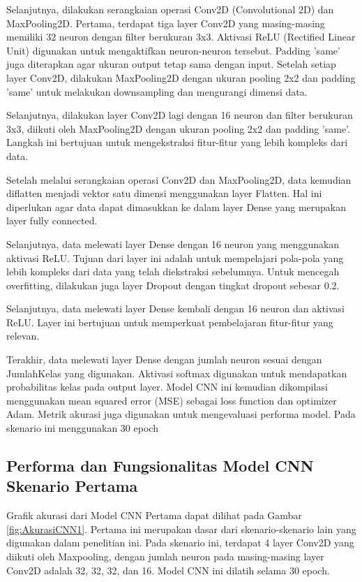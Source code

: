 Selanjutnya, dilakukan serangkaian operasi Conv2D (Convolutional 2D) dan MaxPooling2D. Pertama, terdapat tiga layer Conv2D yang masing-masing memiliki 32 neuron dengan filter berukuran 3x3. Aktivasi ReLU (Rectified Linear Unit) digunakan untuk mengaktifkan neuron-neuron tersebut. Padding 'same' juga diterapkan agar ukuran output tetap sama dengan input. Setelah setiap layer Conv2D, dilakukan MaxPooling2D dengan ukuran pooling 2x2 dan padding 'same' untuk melakukan downsampling dan mengurangi dimensi data.

Selanjutnya, dilakukan layer Conv2D lagi dengan 16 neuron dan filter berukuran 3x3, diikuti oleh MaxPooling2D dengan ukuran pooling 2x2 dan padding 'same'. Langkah ini bertujuan untuk mengekstraksi fitur-fitur yang lebih kompleks dari data.

Setelah melalui serangkaian operasi Conv2D dan MaxPooling2D, data kemudian diflatten menjadi vektor satu dimensi menggunakan layer Flatten. Hal ini diperlukan agar data dapat dimasukkan ke dalam layer Dense yang merupakan layer fully connected.

Selanjutnya, data melewati layer Dense dengan 16 neuron yang menggunakan aktivasi ReLU. Tujuan dari layer ini adalah untuk mempelajari pola-pola yang lebih kompleks dari data yang telah diekstraksi sebelumnya. Untuk mencegah overfitting, dilakukan juga layer Dropout dengan tingkat dropout sebesar 0.2.

Selanjutnya, data melewati layer Dense kembali dengan 16 neuron dan aktivasi ReLU. Layer ini bertujuan untuk memperkuat pembelajaran fitur-fitur yang relevan.

Terakhir, data melewati layer Dense dengan jumlah neuron sesuai dengan JumlahKelas yang digunakan. Aktivasi softmax digunakan untuk mendapatkan probabilitas kelas pada output layer. Model CNN ini kemudian dikompilasi menggunakan mean squared error (MSE) sebagai loss function dan optimizer Adam. Metrik akurasi juga digunakan untuk mengevaluasi performa model. Pada skenario ini menggunakan 30 epoch 

\subsection*{Performa dan Fungsionalitas Model CNN Skenario Pertama}

Grafik akurasi dari Model CNN Pertama dapat dilihat pada Gambar \ref{fig:AkurasiCNN1}. Pertama ini merupakan dasar dari skenario-skenario lain yang digunakan dalam penelitian ini. Pada skenario ini, terdapat 4 layer Conv2D yang diikuti oleh Maxpooling, dengan jumlah neuron pada masing-masing layer Conv2D adalah 32, 32, 32, dan 16. Model CNN ini dilatih selama 30 epoch.

